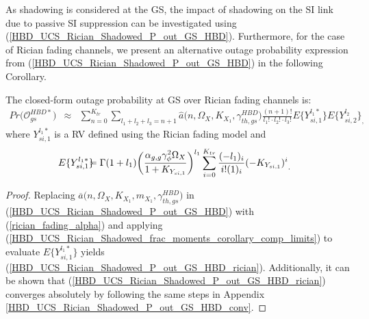 As shadowing is considered at the GS, the impact of shadowing on the SI link due to passive SI suppression can be investigated using (\ref{HBD_UCS_Rician_Shadowed_P_out_GS_HBD}). Furthermore, for the case of Rician fading channels, we present an alternative outage probability expression from (\ref{HBD_UCS_Rician_Shadowed_P_out_GS_HBD}) in the following Corollary.

\begin{corollary} \label{HBD_UCS_Rician_Shadowed_corollary_P_out_GS_HBD_rician}
The closed-form outage probability at GS over Rician fading channels is:
\begin{eqnarray} \label{HBD_UCS_Rician_Shadowed_P_out_GS_HBD_rician}
Pr\big(\mathcal{O}_{gs}^{HBD*}\big) & \approx & \sum_{n=0}^{K_{tr}} \sum_{l_1 + l_2 + l_3 = n+1} \widehat{a}\big(n,\Omega_X,K_{X_1},\gamma_{th,gs}^{HBD}\big) \frac{(n+1)!}{l_1! \cdot l_2! \cdot l_3!} E\{Y_{si,1}^{l_1*}\} E\{Y_{si,2}^{l_2}\}_,
\end{eqnarray}
where $Y_{si,1}^{l_1*}$ is a RV defined using the Rician fading model and
\begin{eqnarray}
\hspace{-0.25cm} E\{Y_{si,1}^{l_1*}\}  & \hspace{-0.25cm} = & \hspace{-0.25cm} \Gamma(1+l_1) \bigg(\frac{\alpha_{g,g}\gamma_{\phi}^2\Omega_X}{1+K_{Y_{si,1}}}\bigg)^{l_1} \sum_{i=0}^{K_{tr}} \frac{(-l_1)_i}{i!(1)_i}{(-K_{Y_{si,1}})^i}_.
\end{eqnarray}
\end{corollary}
\begin{proof}
Replacing $\overline{a}\big(n,\Omega_X,K_{X_1},m_{X_1},\gamma_{th,gs}^{HBD}\big)$ in (\ref{HBD_UCS_Rician_Shadowed_P_out_GS_HBD}) with (\ref{rician_fading_alpha}) and applying (\ref{HBD_UCS_Rician_Shadowed_frac_moments_corollary_comp_limits}) to evaluate $E\{Y_{si,1}^{l_1*}\}$ yields (\ref{HBD_UCS_Rician_Shadowed_P_out_GS_HBD_rician}). Additionally, it can be shown that (\ref{HBD_UCS_Rician_Shadowed_P_out_GS_HBD_rician}) converges absolutely by following the same steps in Appendix \ref{HBD_UCS_Rician_Shadowed_P_out_GS_HBD_conv}.
\end{proof}

